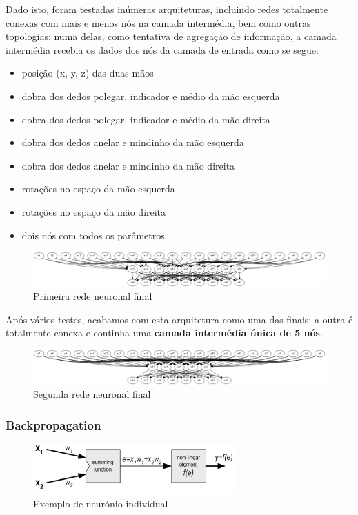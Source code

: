 \documentclass[10pt,a4paper]{article}
\begin{document}
Dado isto, foram testadas inúmeras arquiteturas, incluindo redes totalmente conexas com mais e menos nós na camada intermédia, bem como outras topologias: numa delas, como tentativa de agregação de informação, a camada intermédia recebia os dados dos nós da camada de entrada como se segue:
\begin{itemize}
\item posição (x, y, z) das duas mãos
\item dobra dos dedos polegar, indicador e médio da mão esquerda
\item dobra dos dedos polegar, indicador e médio da mão direita
\item dobra dos dedos anelar e mindinho da mão esquerda
\item dobra dos dedos anelar e mindinho da mão direita
\item rotações no espaço da mão esquerda
\item rotações no espaço da mão direita
\item dois nós com todos os parâmetros
\end{itemize}

\begin{figure}[here]
\centering
\includegraphics[scale=0.15]{net2.png}
\caption{Primeira rede neuronal final}
\end{figure}

Após vários testes, acabamos com esta arquitetura como uma das finais: a outra é totalmente conexa e continha uma \textbf{camada intermédia única de 5 nós}.
\\
\begin{figure}[here]
\centering
\includegraphics[scale=0.15]{net1.png}
\caption{Segunda rede neuronal final}
\end{figure}

\subsubsection{Backpropagation}

\begin{figure}[here]
\centering
\includegraphics{neuron.png}
\caption{Exemplo de neurónio individual}
\end{figure}
\end{document}
